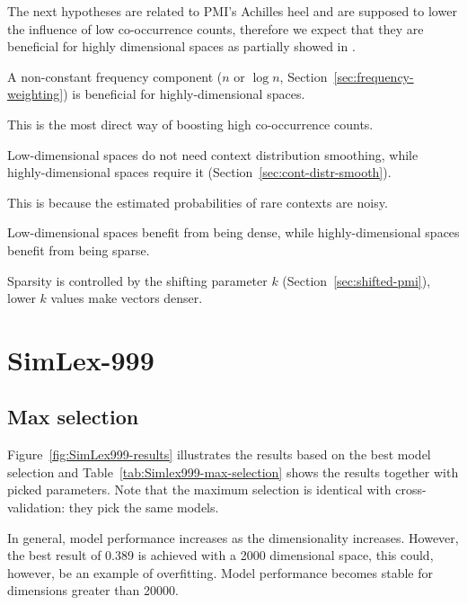 The next hypotheses are related to PMI's Achilles heel and are supposed to lower the influence of low co-occurrence counts, therefore we expect that they are beneficial for highly dimensional spaces as partially showed in .

\begin{hyp}
  \label{hyp:freq}
  A non-constant frequency component ($n$ or $\log n$, Section~\ref{sec:frequency-weighting}) is beneficial for highly-dimensional spaces.
\end{hyp}

This is the most direct way of boosting high co-occurrence counts.

\begin{hyp}
  \label{hyp:cds}
  Low-dimensional spaces do not need context distribution smoothing, while highly-dimensional spaces require it (Section~\ref{sec:cont-distr-smooth}).
\end{hyp}

This is because the estimated probabilities of rare contexts are noisy.

\begin{hyp}
  \label{hyp:neg}
  Low-dimensional spaces benefit from being dense, while highly-dimensional spaces benefit from being sparse.
\end{hyp}

Sparsity is controlled by the shifting parameter $k$ (Section~\ref{sec:shifted-pmi}), lower $k$ values make vectors denser.

\section{SimLex-999}
\label{sec:simlex-999}

\subsection{Max selection}
\label{sec:max-selection-simlex}



Figure~\ref{fig:SimLex999-results} illustrates the results based on the best model selection and Table~\ref{tab:Simlex999-max-selection} shows the results together with picked parameters. Note that the maximum selection is identical with cross-validation: they pick the same models.

In general, model performance increases as the dimensionality increases. However, the best result of 0.389 is achieved with a 2000 dimensional space, this could, however, be an example of overfitting. Model performance becomes stable for dimensions greater than 20000.

